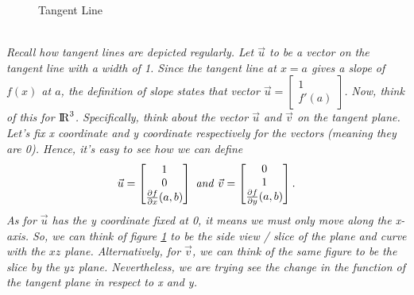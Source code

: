\documentclass[addpoints]{exam}
\begin{document}
\begin{figure}[!h]
    \centering
    \caption{Tangent Line}
    \label{fig:tangent line}
\end{figure}\\
\textit{
Recall how tangent lines are depicted regularly. Let $\vec{u}$ to be a vector on the tangent line with a width of 1. Since the tangent line at $x=a$ gives a slope of $f(x)$ at $a$, the definition of slope states that vector $\vec{u}=\begin{bmatrix}
    1\\f'(a)
\end{bmatrix}$.
}
\textit{
Now, think of this for ${\rm I\!R}^3$. Specifically, think about the vector $\vec{u}$ and $\vec{v}$ on the tangent plane. Let's fix x coordinate and y coordinate respectively for the vectors (meaning they are 0). Hence, it's easy to see how we can define \[\vec{u}=\begin{bmatrix}
    1\\0\\\frac{\partial f}{\partial x}(a,b)
\end{bmatrix} \text{ \textit{and} }\vec{v} =\begin{bmatrix}
    0\\1\\\frac{\partial f}{\partial y}(a,b)
\end{bmatrix}.\]
As for $\vec{u}$ has the y coordinate fixed at 0, it means we must only move along the x-axis. So, we can think of figure \ref{fig:tangent line} to be the side view / slice of the plane and curve with the $xz$ plane. Alternatively, for $\vec{v}$, we can think of the same figure to be the slice by the $yz$ plane. Nevertheless, we are trying see the change in the function of the tangent plane in respect to x and y.
}
\end{document}

